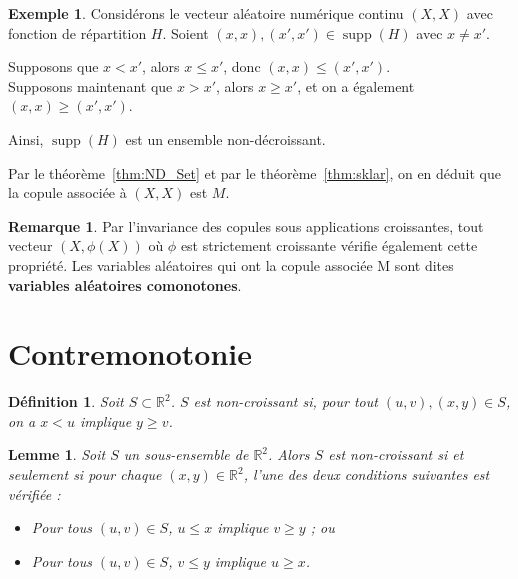 \documentclass[a4paper,11pt]{amsbook}
\numberwithin{equation}{chapter}
\newtheorem{lemme}	    [theoreme]	 {Lemme}
\newtheorem{definition}	[theoreme]   {Définition}
\theoremstyle{definition}
\newtheorem{exemple}	[theoreme]   {Exemple}
\newtheorem{remark}[theoreme]{Remarque}
\begin{document}
\begin{exemple}\label{ex:ND_Set}
Considérons le vecteur aléatoire numérique continu \( (X, X) \) avec fonction de répartition \( H \). Soient \( (x,x), (x',x') \in \operatorname{supp}(H) \) avec \( x \neq x' \).

Supposons que \( x < x' \), alors \( x \leq x' \), donc \( (x, x) \leq (x', x') \).\\
Supposons maintenant que \( x > x' \), alors \( x \geq x' \), et on a également \( (x, x) \geq (x', x') \).

Ainsi, \( \operatorname{supp}(H) \) est un ensemble non-décroissant.

Par le théorème~\ref{thm:ND_Set} et par le théorème~\ref{thm:sklar}, on en déduit que la copule associée à \( (X, X) \) est $M$.
\end{exemple}

\begin{remark}\label{rem:ND_Set}
Par l'invariance des copules sous applications croissantes, tout vecteur \( (X, \phi(X)) \) où \( \phi \) est strictement croissante vérifie également cette propriété. Les variables aléatoires qui ont la copule associée M sont dites \textbf{variables aléatoires comonotones}. 
\end{remark}

\section{Contremonotonie}

\begin{definition}\label{def:NI_Set}
Soit \(S \subset \mathbb{R}^2\). \(S\) est \emph{non-croissant} si, pour tout \((u,v), (x,y) \in S\), on a \(x  < u\) implique \( y \geq v\).
\end{definition}

\begin{lemme}\label{lem:NI_Set1}
Soit $S$ un sous-ensemble de $\mathbb{R}^2$. Alors $S$ est non-croissant si et seulement si pour chaque $(x, y) \in \mathbb{R}^2$, l’une des deux conditions suivantes est vérifiée :
\begin{itemize}
    \item[\((\ast_3)\)] Pour tous $(u, v) \in S$, $u \leq x$ implique $v \geq y$ ; ou
    \item[\((\ast_4)\)] Pour tous $(u, v) \in S$, $v \leq y$ implique $u \geq x$.
\end{itemize}
\end{lemme}
\end{document}
